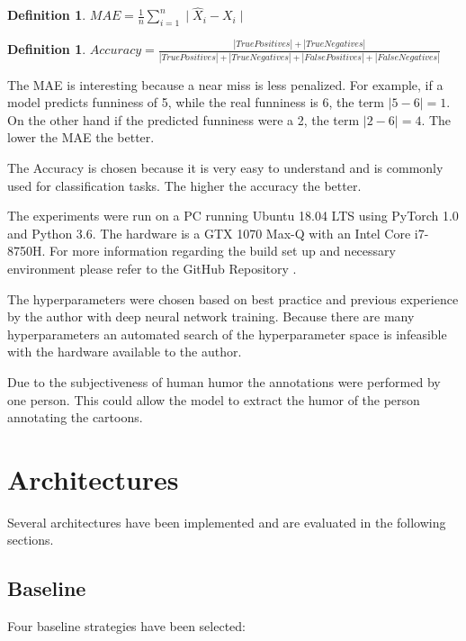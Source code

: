 \documentclass[draft,final,oneside]{vutinfth} %
\newcounter{DefCounter}
\begin{document}
\newtheorem{mae}[DefCounter]{Definition}

\begin{mae}
$MAE = \frac{1}{n}\textstyle \sum_{i=1}^n \displaystyle\mid \hat{X}_i - X_i \mid$
\end{mae}

\newtheorem{accuracy}[DefCounter]{Definition}
\begin{accuracy}
$Accuracy = \frac{|True Positives| + |True Negatives|} {|True Positives| + |True Negatives| + |False Positives| + |False Negatives|}$
\end{accuracy}

The MAE is interesting because a near miss is less penalized. For example, if a model predicts funniness of 5, while the real funniness is 6, the term $\mid 5 - 6 \mid = 1$. On the other hand if the predicted funniness were a 2, the term $\mid 2 - 6 \mid = 4$. The lower the MAE the better.

The Accuracy is chosen because it is very easy to understand and is commonly used for classification tasks. The higher the accuracy the better.

The experiments were run on a PC running Ubuntu 18.04 LTS using PyTorch 1.0 and
Python 3.6. The hardware is a GTX 1070 Max-Q with an Intel Core i7-8750H. For more
information regarding the build set up and necessary environment please refer to the GitHub Repository \cite{deephumorrepo}.

The hyperparameters were chosen based on best practice and previous
experience by the author with deep neural network training. Because there are many hyperparameters an automated search of the hyperparameter space is infeasible with the hardware available to the author.

Due to the subjectiveness of human humor the annotations were performed by one person. This could allow the model to extract the humor of the person annotating the cartoons.

\section{Architectures}
Several architectures have been implemented and are evaluated in the following sections.


\subsection{Baseline}

Four baseline strategies have been selected: 
\end{document}
